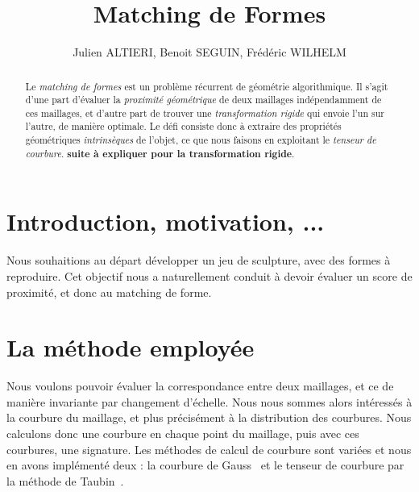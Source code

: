 \documentclass{llncs}
\begin{document}
\title{Matching de Formes}

\author{Julien ALTIERI, Benoit SEGUIN, Frédéric WILHELM}



\maketitle

\begin{abstract}
Le \textit{matching de formes} est un probl\`eme r\'ecurrent de g\'eom\'etrie algorithmique. Il s'agit d'une part d'\'evaluer la \textit{proximit\'e g\'eom\'etrique} de deux maillages ind\'ependamment de ces maillages, et d'autre part de trouver une \textit{transformation rigide} qui envoie l'un sur l'autre, de mani\`ere optimale. Le d\'efi consiste donc à extraire des propri\'et\'es g\'eom\'etriques \textit{intrins\`eques} de l'objet, ce que nous faisons en exploitant le \textit{tenseur de courbure}. \textbf{suite \`a expliquer pour la transformation rigide}.
\end{abstract}

\section{Introduction, motivation, ...}
Nous souhaitions au d\'epart d\'evelopper un jeu de sculpture, avec des formes \`a reproduire. Cet objectif nous a naturellement conduit \`a devoir \'evaluer un score de proximit\'e, et donc au matching de forme.




\section{La m\'ethode employ\'ee}

Nous voulons pouvoir évaluer la correspondance entre deux maillages, et ce de manière invariante par changement d'échelle. Nous nous sommes alors intéressés à la courbure du maillage, et plus précisément à la distribution des courbures. Nous calculons donc une courbure en chaque point du maillage, puis avec ces courbures, une signature. Les méthodes de calcul de courbure sont variées et nous en avons implémenté deux : la courbure de Gauss~\cite{rugis} et le tenseur de courbure par la méthode de Taubin~\cite{taubin}.
\end{document}
